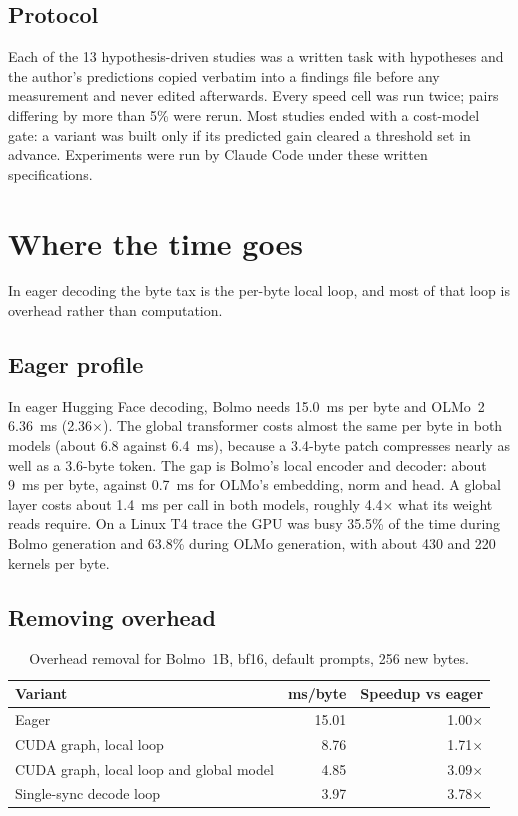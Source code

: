 \documentclass[11pt,a4paper]{article}
\newcommand{\x}{\ensuremath{\times}}
\begin{document}
\subsection{Protocol}

Each of the 13 hypothesis-driven studies was a written task with hypotheses and the author's predictions copied verbatim into a findings file before any measurement and never edited afterwards. Every speed cell was run twice; pairs differing by more than 5\% were rerun. Most studies ended with a cost-model gate: a variant was built only if its predicted gain cleared a threshold set in advance. Experiments were run by Claude Code under these written specifications.

\section{Where the time goes}

In eager decoding the byte tax is the per-byte local loop, and most of that loop is overhead rather than computation.

\subsection{Eager profile}

In eager Hugging Face decoding, Bolmo needs 15.0~ms per byte and OLMo~2 6.36~ms (2.36\x). The global transformer costs almost the same per byte in both models (about 6.8 against 6.4~ms), because a 3.4-byte patch compresses nearly as well as a 3.6-byte token. The gap is Bolmo's local encoder and decoder: about 9~ms per byte, against 0.7~ms for OLMo's embedding, norm and head. A global layer costs about 1.4~ms per call in both models, roughly 4.4\x{} what its weight reads require. On a Linux T4 trace the GPU was busy 35.5\% of the time during Bolmo generation and 63.8\% during OLMo generation, with about 430 and 220 kernels per byte.

\subsection{Removing overhead}

\begin{table}[htbp]
\centering
\caption{Overhead removal for Bolmo~1B, bf16, default prompts, 256 new bytes.}
\label{tab:overhead}
\begin{tabular}{lrr}
\toprule
Variant & ms/byte & Speedup vs eager \\
\midrule
Eager & 15.01 & 1.00\x \\
CUDA graph, local loop & 8.76 & 1.71\x \\
CUDA graph, local loop and global model & 4.85 & 3.09\x \\
Single-sync decode loop & 3.97 & 3.78\x \\
\bottomrule
\end{tabular}
\end{table}
\end{document}
